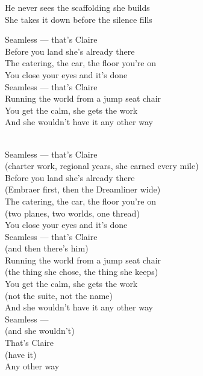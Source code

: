 \begin{lyrics}
He never sees the scaffolding she builds\\
She takes it down before the silence fills

Seamless — that's Claire\\
Before you land she's already there\\
The catering, the car, the floor you're on\\
You close your eyes and it's done\\
Seamless — that's Claire\\
Running the world from a jump seat chair\\
You get the calm, she gets the work\\
And she wouldn't have it any other way

\\
Seamless — that's Claire\\
(charter work, regional years, she earned every mile)\\
Before you land she's already there\\
(Embraer first, then the Dreamliner wide)\\
The catering, the car, the floor you're on\\
(two planes, two worlds, one thread)\\
You close your eyes and it's done\\
Seamless — that's Claire\\
(and then there's him)\\
Running the world from a jump seat chair\\
(the thing she chose, the thing she keeps)\\
You get the calm, she gets the work\\
(not the suite, not the name)\\
And she wouldn't have it any other way\\
Seamless —\\
(and she wouldn't)\\
That's Claire\\
(have it)\\
Any other way

\end{lyrics}

